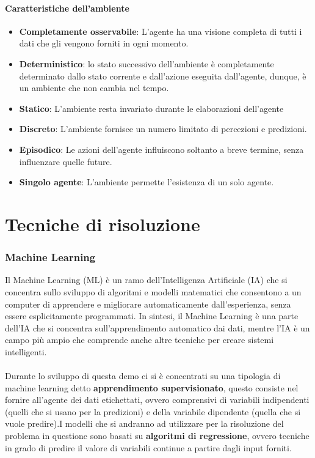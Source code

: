 \documentclass{article}
\begin{document}
    \subsection{Caratteristiche dell'ambiente}
        \begin{itemize}
            \item \textbf{Completamente osservabile}: L'agente ha una visione completa di tutti i dati che gli vengono forniti in ogni momento.
            \item \textbf{Deterministico}: lo stato successivo dell’ambiente è completamente determinato dallo stato corrente e dall’azione eseguita dall’agente, dunque, è un ambiente che non cambia nel tempo.
            \item \textbf{Statico}: L'ambiente resta invariato durante le elaborazioni dell'agente
            \item \textbf{Discreto}: L'ambiente fornisce un numero limitato di percezioni e predizioni.
            \item \textbf{Episodico}: Le azioni dell'agente influiscono soltanto a breve termine, senza influenzare quelle future.
            \item \textbf{Singolo agente}: L'ambiente permette l'esistenza di un solo agente.
        \end{itemize}
        
\newpage
\part{Tecniche di risoluzione}
    \section{Machine Learning}
    Il Machine Learning (ML) è un ramo dell'Intelligenza Artificiale (IA) che si concentra sullo sviluppo di algoritmi e modelli matematici che consentono a un computer di apprendere e migliorare automaticamente dall'esperienza, senza essere esplicitamente programmati.
    \newline
    In sintesi, il Machine Learning è una parte dell'IA che si concentra sull'apprendimento automatico dai dati, mentre l'IA è un campo più ampio che comprende anche altre tecniche per creare sistemi intelligenti.\\
    \\
    Durante lo sviluppo di questa demo ci si è concentrati su una tipologia di machine learning detto \textbf{apprendimento supervisionato}, questo consiste nel fornire all'agente dei dati etichettati, ovvero comprensivi di variabili indipendenti (quelli che si usano per la predizioni) e della variabile dipendente (quella che si vuole predire).\newline I modelli che si andranno ad utilizzare per la risoluzione del problema in questione sono basati su \textbf{algoritmi di regressione}, ovvero tecniche in grado di predire il valore di variabili continue a partire dagli input forniti. 
\end{document}
